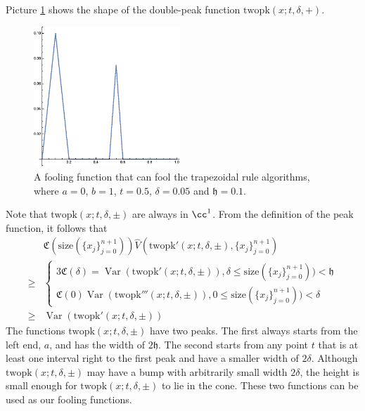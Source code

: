 \documentclass{iitthesis}
\DeclareMathOperator{\Var}{Var}
\theoremstyle{definition}
\theoremstyle{remark}
\begin{document}
Picture \ref{fig:twopkfunction} shows the shape of the double-peak function $\text{twopk}(x;t,\delta,+)$.
\begin{figure}[ht]
\centering
\includegraphics[width=5.5cm]{twopk.eps}
\caption{A fooling function that can fool the trapezoidal rule algorithms, where $a=0$, $b=1$, $t=0.5$, $\delta=0.05$ and $\mathfrak{h}=0.1$. \label{fig:twopkfunction}}
\end{figure}
Note that $\text{twopk}(x;t,\delta,\pm)$ are always in $\cc^1$.
From the definition of the peak function, it follows that
\begin{align*}
  &\mathfrak{C}(\text{size}(\{x_j\}_{j=0}^{n+1}))\widehat{V}(\text{twopk}'(x;t,\delta,\pm),\{x_j\}_{j=0}^{n+1})\\
  \ge & \begin{cases} \displaystyle 3\mathfrak{C}(\delta)=\Var(\text{twopk}'(x;t,\delta,\pm)), \delta \le \text{size}(\{x_j\}_{j=0}^{n+1})) <\mathfrak{h}\\[1ex]
                      \displaystyle \mathfrak{C}(0)\Var(\text{twopk}'''(x;t,\delta,\pm)), 0\le \text{size}(\{x_j\}_{j=0}^{n+1}))<\delta
        \end{cases}\\
  \ge & \Var(\text{twopk}'(x;t,\delta,\pm))
\end{align*}
The functions $\text{twopk}(x;t,\delta,\pm)$ have two peaks. The first always starts from the left end, $a$, and has the width of $2\mathfrak{h}$. The second starts from any point $t$ that is at least one interval right to the first peak and have a smaller width of $2\delta$. Although $\text{twopk}(x;t,\delta,\pm)$ may have a bump with arbitrarily small width $2\delta$, the height is small enough for $\text{twopk}(x;t,\delta,\pm)$ to lie in the cone. These two functions can be used as our fooling functions.
\end{document}
